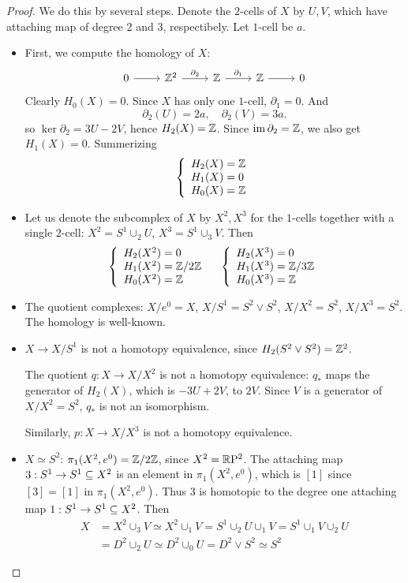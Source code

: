 \begin{proof}
We do this by several steps. Denote the $2$-cells of $X$ by $U,V$, which have attaching map of degree $2$ and $3$, respectibely. Let $1$-cell be $a$.
\begin{itemize}
\item First, we compute the homology of $X$:
\[\begin{tikzcd}
0\ar[r]&\Z^2\ar[r,"\partial_2"]&\Z\ar[r,"\partial_1"]&\Z\ar[r]&0
\end{tikzcd}\]
Clearly $H_0(X)=0$. Since $X$ has only one $1$-cell, $\partial_1=0$. And
\[\partial_2(U)=2a,\quad \partial_2(V)=3a.\]
so $\ker\partial_2=3U-2V$, hence $H_2(X)=\mathbb{Z}$. Since $\mathrm{im}\,\partial_2=\mathbb{Z}$, we also get $H_1(X)=0$. Summerizing
\[\left\{\begin{array}{l}
H_2(X)=\mathbb{Z}\\
H_1(X)=0\\
H_0(X)=\mathbb{Z}
\end{array}\right. \]
\item Let us denote the subcomplex of $X$ by $X^2,X^3$ for the $1$-cells together with a single $2$-cell: $X^2=S^1\cup_2 U$, $X^3=S^1\cup_3 V$. Then
\[\left\{\begin{array}{l}
H_2(X^2)=0\\
H_1(X^2)=\mathbb{Z}/2\mathbb{Z}\\
H_0(X^2)=\mathbb{Z}
\end{array}\right. \quad
\left\{\begin{array}{l}
H_2(X^3)=0\\
H_1(X^3)=\mathbb{Z}/3\mathbb{Z}\\
H_0(X^3)=\mathbb{Z}
\end{array}\right. \]
\item The quotient complexes: $X/e^0=X$, $X/S^1=S^2\vee S^2$, $X/X^2=S^2$, $X/X^3=S^2$. The homology is well-known.
\item $X\to X/S^1$ is not a homotopy equivalence, since $H_2(S^2\vee S^2)=\mathbb{Z}^2$.\par
The quotient $q:X\to X/X^2$ is not a homotopy equivalence: $q_*$ maps the generator of $H_2(X)$, which is $-3U+2V$, to $2V$. Since $V$ is a generator of $X/X^2=S^2$, $q_*$ is not an isomorphism.\par
Similarly, $p:X\to X/X^3$ is not a homotopy equivalence.
\item $X\simeq S^2$: $\pi_1(X^2,e^0)=\mathbb{Z}/2\mathbb{Z}$, since $X^2=\mathbb{R}\mathrm{P}^2$. The attaching map $3:S^1\to S^1\subseteq X^2$ is an element in $\pi_1(X^2,e^0)$, which is $[1]$ since $[3]=[1]$ in $\pi_1(X^2,e^0)$. Thus $3$ is homotopic to the degree one attaching map $1:S^1\to S^1\subseteq X^2$. Then
\begin{align*}
X&=X^2\cup_3 V\simeq X^2\cup_1 V=S^1\cup_2 U\cup_1 V=S^1\cup_1 V\cup_2 U\\
&=D^2\cup_2 U\simeq D^2\cup_0 U=D^2\vee S^2\simeq S^2
\end{align*}
\end{itemize}
\end{proof}
